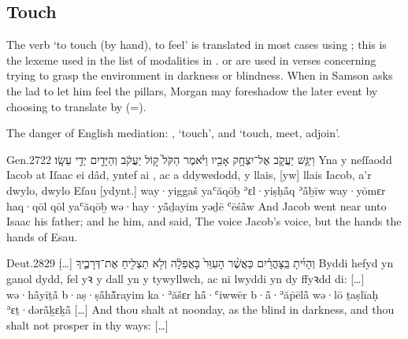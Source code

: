 \subsection{Touch}


\begin{paper}
	{\click} The verb  ‘to touch (by hand), to feel’ is translated in most cases using ; this is the lexeme used in the list of modalities in .  or  are used in verses concerning trying to grasp the environment in darkness or blindness. When in  Samson asks the lad to let him feel the pillars, Morgan may foreshadow the later event by choosing to translate  by  (=).

	\begin{leftbar}
		\begin{compactitem}
			\item The danger of English mediation: , ‘touch’, and  ‘touch, meet, adjoin’.
		\end{compactitem}
	\end{leftbar}
\end{paper}

\begin{example}{Gen.}{27}{22}{}{}
	\quoling
	{וַיִּגַּ֧שׁ יַעֲקֹ֛ב אֶל־יִצְחָ֥ק אָבִ֖יו  וַיֹּ֗אמֶר הַקֹּל֙ ק֣וֹל יַעֲקֹ֔ב וְהַיָּדַ֖יִם יְדֵ֥י עֵשָֽׂו׃}
	{Yna y neſſaodd Iacob at Iſaac ei dâd, yntef ai , ac a ddywedodd, y llais, [yw] llais Iacob, a’r dwylo, dwylo Eſau [ydynt.]}
	{way·yiggaš yaʿăqōḇ ʾɛl·yiṣḥå̄q ʾå̄ḇīw  way·yōmɛr haq·qōl qōl yaʿăqōḇ wə·hay·yå̄ḏayim yəḏē ʿēśå̄w}
	{And Jacob went near unto Isaac his father; and he  him, and said, The voice  Jacob’s voice, but the hands  the hands of Esau.}
\end{example}

\begin{example}{Deut.}{28}{29}{}{}
	\quoling
	{וְהָיִ֜יתָ  בַּֽצָּהֳרַ֗יִם כַּאֲשֶׁ֨ר  הָעִוֵּר֙ בָּאֲפֵלָ֔ה וְלֹ֥א תַצְלִ֖יחַ אֶת־דְּרָכֶ֑יךָ […]׃}
	{Byddi hefyd yn  ganol dydd, fel yꝛ  y dall yn y tywyllwch, ac ni lwyddi yn dy ffyꝛdd di: […]}
	{wə·hå̄yīṯå̄  b·aṣ·ṣå̄hå̄̆rayim ka·ʾăšɛr  hå̄·ʿiwwēr b·å̄·ʾăp̄ēlå̄ wə·lō ṯaṣlīaḥ ʾɛṯ·dərå̄ḵɛḵå̄ […]}
	{And thou shalt  at noonday, as the blind  in darkness, and thou shalt not prosper in thy ways: […]}
\end{example}

